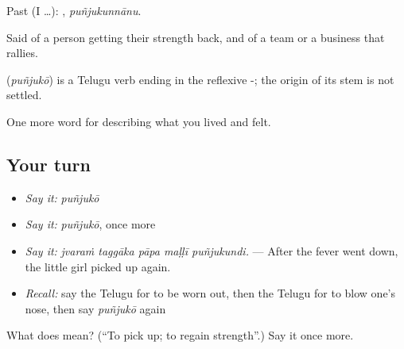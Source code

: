 Past (I …): , \emph{puñjukunnānu}.

Said of a person getting their strength back, and of a team or a business that rallies.

\begin{cousinweb}
\textbf{} (\emph{puñjukō}) is a Telugu verb ending in the reflexive -; the origin of its stem is not settled.
\end{cousinweb}

\begin{grammarlens}[title={What you've built}]
One more word for describing what you lived and felt.
\end{grammarlens}

\subsection*{Your turn}
\begin{itemize}
\raggedright
  \item \emph{Say it:} \emph{puñjukō}
  \item \emph{Say it:} \emph{puñjukō}, once more
  \item \emph{Say it:} \emph{jvaraṁ taggāka pāpa maḷḷī puñjukundi.} — After the fever went down, the little girl picked up again.
  \item \emph{Recall:} say the Telugu for to be worn out, then the Telugu for to blow one's nose, then say \emph{puñjukō} again
\end{itemize}

\begin{tcolorbox}[breakable,colback=teal!4,colframe=teal!35!black,title={Before you move on}]
What does  mean? (\textquotedblleft{}To pick up; to regain strength\textquotedblright{}.) Say it once more.
\end{tcolorbox}
